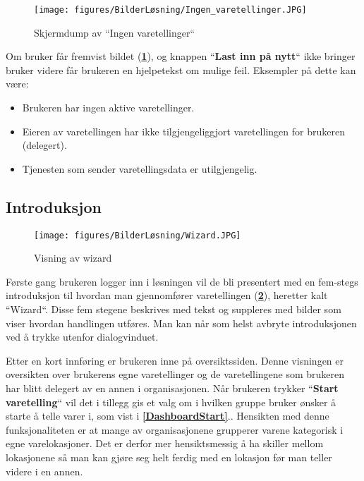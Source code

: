 \begin{figure}[H] 
    \centering
    \texttt{[image: figures/BilderLøsning/Ingen\_varetellinger.JPG]}
    \caption{Skjermdump av ``Ingen varetellinger``}
    \label{Ingen_varetellinger}
\end{figure}

Om bruker får fremvist bildet (\textbf{\ref{Ingen_varetellinger}}), og knappen ``\textbf{Last inn på nytt}`` ikke bringer bruker videre får brukeren en hjelpetekst om mulige feil. Eksempler på dette kan være:

\begin{itemize}
  \item Brukeren har ingen aktive varetellinger.
  \item Eieren av varetellingen har ikke tilgjengeliggjort varetellingen for brukeren (delegert).
  \item Tjenesten som sender varetellingsdata er utilgjengelig.
\end{itemize}

\subsection{\textbf{Introduksjon}}
\begin{figure}[H] 
    \centering
    \texttt{[image: figures/BilderLøsning/Wizard.JPG]}
    \caption{Visning av wizard}
    \label{Wizard}
\end{figure}

Første gang brukeren logger inn i løsningen vil de bli presentert med en fem-stegs introduksjon til hvordan man gjennomfører varetellingen (\textbf{\ref{Wizard}}), heretter kalt ``Wizard``. Disse fem stegene beskrives med tekst og suppleres med bilder som viser hvordan handlingen utføres. Man kan når som helst avbryte introduksjonen ved å trykke utenfor dialogvinduet.

Etter en kort innføring er brukeren inne på oversiktssiden. Denne visningen er oversikten over brukerens egne varetellinger og de varetellingene som brukeren har blitt delegert av en annen i organisasjonen. Når brukeren trykker ``\textbf{Start varetelling}`` vil det i tillegg gis et valg om i hvilken gruppe bruker ønsker å starte å telle varer i, som vist i \textbf{\ref{DashboardStart}}.. Hensikten med denne funksjonaliteten er at mange av organisasjonene grupperer varene kategorisk i egne varelokasjoner. Det er derfor mer hensiktsmessig å ha skiller mellom lokasjonene så man kan gjøre seg helt ferdig med en lokasjon før man teller videre i en annen.

